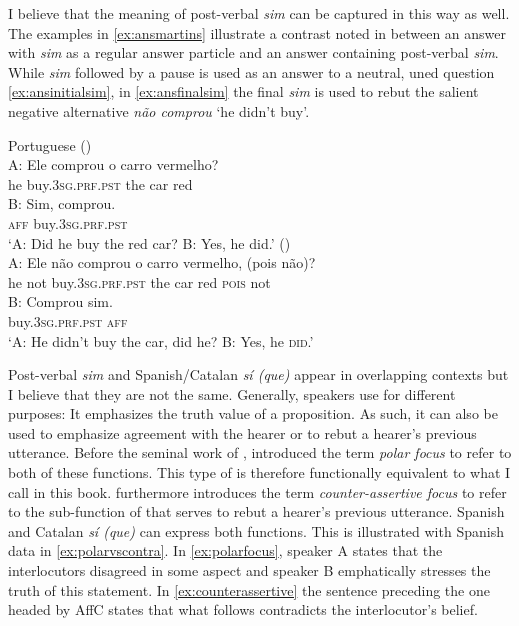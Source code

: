 I believe that the meaning of post-verbal \emph{sim} can be captured in this way as well. The examples in \eqref{ex:ansmartins} illustrate a  contrast noted in  \citet{Martins2013} between an answer with \emph{sim}  as a regular answer particle and an answer containing post-verbal \emph{sim}. While \emph{sim} followed by a pause is  used as an answer to a neutral, uned question \eqref{ex:ansinitialsim}, in \eqref{ex:ansfinalsim} the final \emph{sim} is used to rebut the salient negative alternative \emph{não comprou} `he didn't buy'.

\ea\label{ex:ansmartins} Portuguese
\ea\label{ex:ansinitialsim}
 (\citealt[117: ex 56a-b]{Martins2013})\\ 
\gll A: Ele comprou o carro vermelho? \\
{} he buy.\textsc{3sg.prf.pst} the car red\\
\exi{}\gll B: Sim, comprou.\\
{} \textsc{aff} buy.\textsc{3sg.prf.pst}\\
\glt `A: Did he buy the red car? B: Yes, he did.' 
\ex\label{ex:ansfinalsim} (\citealt[117: ex 57a-b]{Martins2013})\\
\gll A: Ele não comprou o carro vermelho, (pois não)? \\
{} he not buy.\textsc{3sg.prf.pst} the car red \textsc{pois} not\\
\exi{}\gll B: Comprou sim.\\
{} buy.\textsc{3sg.prf.pst} \textsc{aff}\\
\glt `A: He didn't buy the car, did he? B: Yes, he \textsc{did}.'
\z
\z

Post-verbal \emph{sim} and Spanish/Catalan \emph{sí (que)} appear in overlapping contexts but I believe that  they are not the same. Generally, speakers use  for different purposes: It emphasizes the truth value of a proposition. As such, it can also be used to emphasize agreement with the hearer or to rebut a hearer's previous utterance. Before the seminal work of \citet{Hohle1992}, \citet{Watters1979} introduced the term  \emph{polar focus} to refer to  both of these functions. This type of  is therefore functionally equivalent to what I call  in this book. \citet{Watters1979}  furthermore introduces the term \emph{counter-assertive focus} to refer to the sub-function of  that serves to rebut a hearer's previous utterance.   Spanish and Catalan \emph{sí (que)}  can express both functions. This is illustrated with Spanish data in \eqref{ex:polarvscontra}. In \eqref{ex:polarfocus}, speaker A states that the interlocutors disagreed in some aspect and speaker B emphatically stresses the truth of this statement. In \eqref{ex:counterassertive} the sentence preceding the one headed by AffC states that what follows contradicts the interlocutor's belief.



